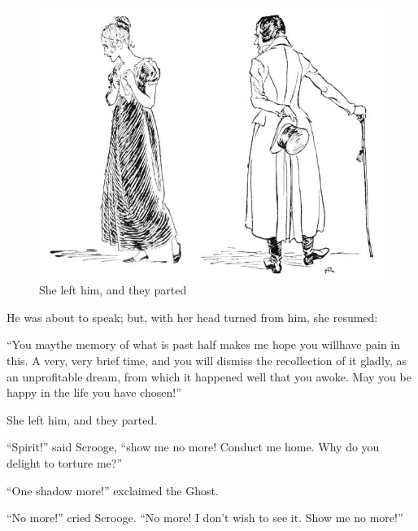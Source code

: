 \documentclass[paper=5.5in:8.5in,BCOR=10mm,twoside,DIV=15,12pt,usegeometry,openany]{scrbook} %
\begin{document}
\begin{figure}[tbh]
\begin{minipage}[c]{\linewidth}
\includegraphics[width=\linewidth]{gs081}
\caption*{She left him, and they parted}
\end{minipage}
\end{figure}

He was about to speak; but, with her head turned from him, she resumed:

\enquote{You may\textemdash the memory of what is past half makes me hope you will\textemdash have pain in this. A very, very brief time, and you will dismiss the recollection of it gladly, as an unprofitable dream, from which it happened well that you awoke. May you be happy in the life you have chosen!}

She left him, and they parted.

\enquote{Spirit!} said Scrooge, \enquote{show me no more! Conduct me home. Why do you delight to torture me?}

\enquote{One shadow more!} exclaimed the Ghost.

\enquote{No more!} cried Scrooge. \enquote{No more! I don't wish to see it. Show me no more!}
\end{document}

